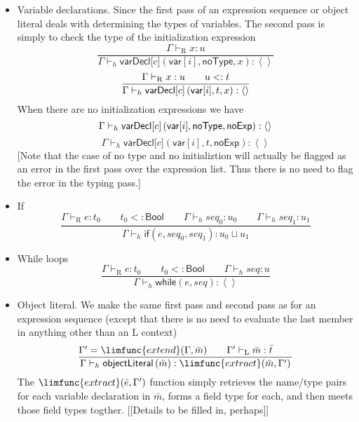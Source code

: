 \documentclass[12pt]{article}
\begin{document}
\begin{itemize}
\item Variable declarations. Since the first pass of an expression sequence
or object literal deals with determining the types of variables. The second
pass is simply to check the type of the initialization expression%
\begin{equation*}
\frac{\Gamma \vdash _{\mathrm{R}}x:u}{\Gamma \vdash _{h}\mathsf{varDecl[}c%
\mathsf{]}\left( \mathsf{var}[i],\mathsf{noType},x\right) :\left\langle
{}\right\rangle }
\end{equation*}%
\begin{equation*}
\frac{\Gamma \vdash _{\mathrm{R}}x:u\qquad u<:t}{\Gamma \vdash _{h}\mathsf{%
varDecl[}c\mathsf{]}\left( \mathsf{var}[i],t,x\right) :\left\langle
{}\right\rangle }
\end{equation*}%
When there are no initialization expressions we have%
\begin{equation*}
\Gamma \vdash _{h}\mathsf{varDecl[}c\mathsf{]}\left( \mathsf{var}[i],\mathsf{%
noType},\mathsf{noExp}\right) :\left\langle {}\right\rangle 
\end{equation*}%
\begin{equation*}
\Gamma \vdash _{h}\mathsf{varDecl[}c\mathsf{]}\left( \mathsf{var}[i],t,%
\mathsf{noExp}\right) :\left\langle {}\right\rangle 
\end{equation*}%
[Note that the case of no type and no initializtion will actually be flagged
as an error in the first pass over the expression list. Thus there is no
need to flag the error in the typing pass.]

\item If%
\begin{equation*}
\frac{\Gamma \vdash _{\mathrm{R}}e:t_{0}\qquad t_{0}<:\mathsf{Bool}\qquad
\Gamma \vdash _{h}\mathit{seq}_{0}:u_{0}\qquad \Gamma \vdash _{h}\mathit{seq}%
_{1}:u_{1}}{\Gamma \vdash _{h}\mathsf{if}(e,\mathit{seq}_{0},\mathit{seq}%
_{1}):u_{0}\sqcup u_{1}}
\end{equation*}

\item While loops%
\begin{equation*}
\frac{\Gamma \vdash _{\mathrm{R}}e:t_{0}\qquad t_{0}<:\mathsf{Bool}\qquad
\Gamma \vdash _{h}\mathit{seq}:u}{\Gamma \vdash _{h}\mathsf{while}\left( e,%
\mathit{seq}\right) :\left\langle {}\right\rangle }
\end{equation*}

\item Object literal. We make the same first pass and second pass as for an
expression sequence (except that there is no need to evaluate the last
member in anything other than an L context)%
\begin{equation*}
\frac{\Gamma ^{\prime }=\limfunc{extend}(\Gamma ,\bar{m})\qquad \Gamma
^{\prime }\vdash _{\mathrm{L}}\bar{m}:\bar{t}\qquad }{\Gamma \vdash _{h}%
\mathsf{objectLiteral}\left( \bar{m}\right) :\limfunc{extract}(\bar{m}%
,\Gamma ^{\prime })}
\end{equation*}%
The $\limfunc{extract}(\bar{e},\Gamma ^{\prime })$ function simply retrieves
the name/type pairs for each variable declaration in $\bar{m}$, forms a
field type for each, and then meets those field types togther. [[Details to
be filled in, perhaps]]


\end{itemize}
\end{document}

